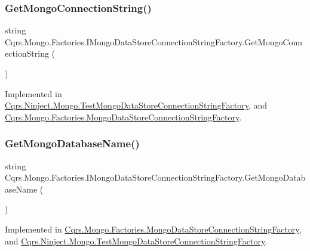 \subsubsection{\texorpdfstring{Get\+Mongo\+Connection\+String()}{GetMongoConnectionString()}}
{\footnotesize\ttfamily string Cqrs.\+Mongo.\+Factories.\+I\+Mongo\+Data\+Store\+Connection\+String\+Factory.\+Get\+Mongo\+Connection\+String (\begin{DoxyParamCaption}{ }\end{DoxyParamCaption})}



Implemented in \hyperlink{classCqrs_1_1Ninject_1_1Mongo_1_1TestMongoDataStoreConnectionStringFactory_ae23b67139698984823fa7c250dcca47a}{Cqrs.\+Ninject.\+Mongo.\+Test\+Mongo\+Data\+Store\+Connection\+String\+Factory}, and \hyperlink{classCqrs_1_1Mongo_1_1Factories_1_1MongoDataStoreConnectionStringFactory_a33064b1b1cbf06ef4f9e12371c7ef785}{Cqrs.\+Mongo.\+Factories.\+Mongo\+Data\+Store\+Connection\+String\+Factory}.

\mbox{\label{interfaceCqrs_1_1Mongo_1_1Factories_1_1IMongoDataStoreConnectionStringFactory_a90de27c2bf23d7f9412d55c09ab2ec8c}} 
\subsubsection{\texorpdfstring{Get\+Mongo\+Database\+Name()}{GetMongoDatabaseName()}}
{\footnotesize\ttfamily string Cqrs.\+Mongo.\+Factories.\+I\+Mongo\+Data\+Store\+Connection\+String\+Factory.\+Get\+Mongo\+Database\+Name (\begin{DoxyParamCaption}{ }\end{DoxyParamCaption})}



Implemented in \hyperlink{classCqrs_1_1Mongo_1_1Factories_1_1MongoDataStoreConnectionStringFactory_a7f330359f2db5b86ad28ac7d8a4c49f1}{Cqrs.\+Mongo.\+Factories.\+Mongo\+Data\+Store\+Connection\+String\+Factory}, and \hyperlink{classCqrs_1_1Ninject_1_1Mongo_1_1TestMongoDataStoreConnectionStringFactory_ac638a5771711c1d0746ee0ec55c5e192}{Cqrs.\+Ninject.\+Mongo.\+Test\+Mongo\+Data\+Store\+Connection\+String\+Factory}.

